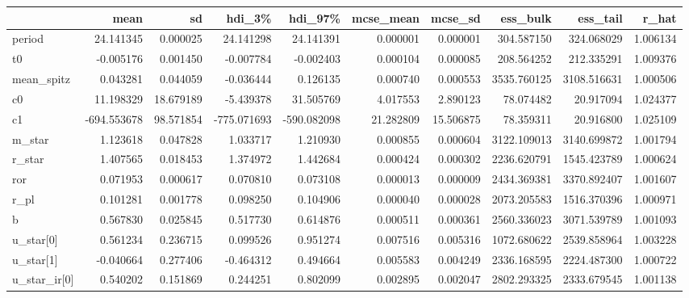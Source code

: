 \begin{tabular}{lrrrrrrrrr}
\toprule
{} &        mean &         sd &      hdi\_3\% &     hdi\_97\% &  mcse\_mean &    mcse\_sd &     ess\_bulk &     ess\_tail &     r\_hat \\
\midrule
period        &   24.141345 &   0.000025 &   24.141298 &   24.141391 &   0.000001 &   0.000001 &   304.587150 &   324.068029 &  1.006134 \\
t0            &   -0.005176 &   0.001450 &   -0.007784 &   -0.002403 &   0.000104 &   0.000085 &   208.564252 &   212.335291 &  1.009376 \\
mean\_spitz    &    0.043281 &   0.044059 &   -0.036444 &    0.126135 &   0.000740 &   0.000553 &  3535.760125 &  3108.516631 &  1.000506 \\
c0            &   11.198329 &  18.679189 &   -5.439378 &   31.505769 &   4.017553 &   2.890123 &    78.074482 &    20.917094 &  1.024377 \\
c1            & -694.553678 &  98.571854 & -775.071693 & -590.082098 &  21.282809 &  15.506875 &    78.359311 &    20.916800 &  1.025109 \\
m\_star        &    1.123618 &   0.047828 &    1.033717 &    1.210930 &   0.000855 &   0.000604 &  3122.109013 &  3140.699872 &  1.001794 \\
r\_star        &    1.407565 &   0.018453 &    1.374972 &    1.442684 &   0.000424 &   0.000302 &  2236.620791 &  1545.423789 &  1.000624 \\
ror           &    0.071953 &   0.000617 &    0.070810 &    0.073108 &   0.000013 &   0.000009 &  2434.369381 &  3370.892407 &  1.001607 \\
r\_pl          &    0.101281 &   0.001778 &    0.098250 &    0.104906 &   0.000040 &   0.000028 &  2073.205583 &  1516.370396 &  1.000971 \\
b             &    0.567830 &   0.025845 &    0.517730 &    0.614876 &   0.000511 &   0.000361 &  2560.336023 &  3071.539789 &  1.001093 \\
u\_star[0]     &    0.561234 &   0.236715 &    0.099526 &    0.951274 &   0.007516 &   0.005316 &  1072.680622 &  2539.858964 &  1.003228 \\
u\_star[1]     &   -0.040664 &   0.277406 &   -0.464312 &    0.494664 &   0.005583 &   0.004249 &  2336.168595 &  2224.487300 &  1.000722 \\
u\_star\_ir[0]  &    0.540202 &   0.151869 &    0.244251 &    0.802099 &   0.002895 &   0.002047 &  2802.293325 &  2333.679545 &  1.001138 \\

\end{tabular}
